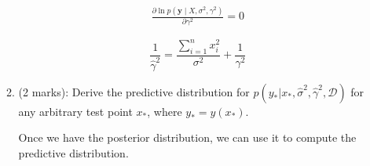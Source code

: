 \documentclass[11pt]{article}
\newcommand{\mbf}[1]{{\boldsymbol{\mathbf{#1}}}}
\renewcommand{\bm}{\mbf}
\begin{document}
\begin{enumerate}
\begin{enumerate}[label=(\alph*)]
$$
\begin{aligned}
\frac{\partial{\ln p(\mathbf{y} \mid X, \sigma^2, \gamma^2)}}{\partial{\gamma^2}} = 0
\end{aligned}
$$

$$
\frac{1}{\hat{\gamma}^2} = \frac{\sum_{i=1}^{n}{x_i^2}}{\sigma^2} + \frac{1}{\gamma^2}
$$



















\item (2 marks): Derive the predictive distribution for $p( y_* | {x}_*, \hat{\sigma}^2, \hat{\gamma}^2, \mathcal{D})$ for any arbitrary test point $x_*$,
where $y_* = y(x_*)$.

Once we have the posterior distribution, we can use it to compute the predictive distribution.


\end{enumerate}
\end{enumerate}
\end{document}
